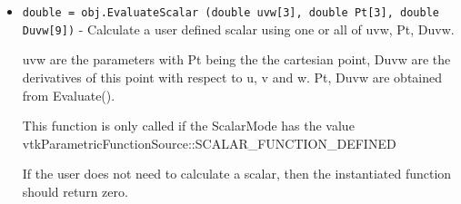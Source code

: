\begin{itemize}
\item  \verb|double = obj.EvaluateScalar (double uvw[3], double Pt[3], double Duvw[9])| -  Calculate a user defined scalar using one or all of uvw, Pt, Duvw.

 uvw are the parameters with Pt being the the cartesian point, 
 Duvw are the derivatives of this point with respect to u, v and w.
 Pt, Duvw are obtained from Evaluate().

 This function is only called if the ScalarMode has the value
 vtkParametricFunctionSource::SCALAR\_FUNCTION\_DEFINED

 If the user does not need to calculate a scalar, then the 
 instantiated function should return zero. 


\end{itemize}
